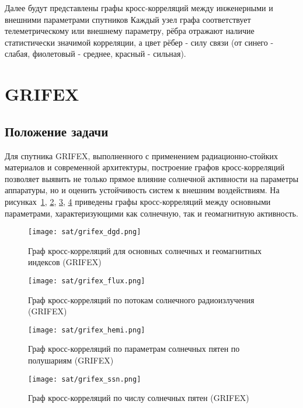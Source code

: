 Далее будут представлены графы кросс-корреляций между инженерными и внешними параметрами спутников Каждый узел графа соответствует телеметрическому или внешнему параметру, рёбра отражают наличие статистически значимой корреляции, а цвет рёбер - силу связи (от синего - слабая, фиолетовый - среднее, красный - сильная).


\section{GRIFEX}

\subsection{Положение задачи}

Для спутника GRIFEX, выполненного с применением радиационно-стойких материалов и
современной архитектуры, построение графов кросс-корреляций позволяет выявить не
только прямое влияние солнечной активности на параметры аппаратуры, но и оценить
устойчивость систем к внешним воздействиям. На рисунках~\ref{fig:grifex_dgd},
\ref{fig:grifex_flux}, \ref{fig:grifex_hemi}, \ref{fig:grifex_ssn} приведены
графы кросс-корреляций между основными параметрами, характеризующими как
солнечную, так и геомагнитную активность.

\begin{figure}[H]
	\centering
	\texttt{[image: sat/grifex\_dgd.png]}
	\caption{Граф кросс-корреляций для основных солнечных и геомагнитных индексов (GRIFEX)}
	\label{fig:grifex_dgd}
\end{figure}

\begin{figure}[H]
	\centering
	\texttt{[image: sat/grifex\_flux.png]}
	\caption{Граф кросс-корреляций по потокам солнечного радиоизлучения (GRIFEX)}
	\label{fig:grifex_flux}
\end{figure}

\begin{figure}[H]
	\centering
	\texttt{[image: sat/grifex\_hemi.png]}
	\caption{Граф кросс-корреляций по параметрам солнечных пятен по полушариям (GRIFEX)}
	\label{fig:grifex_hemi}
\end{figure}

\begin{figure}[H]
	\centering
	\texttt{[image: sat/grifex\_ssn.png]}
	\caption{Граф кросс-корреляций по числу солнечных пятен (GRIFEX)}
	\label{fig:grifex_ssn}
\end{figure}

